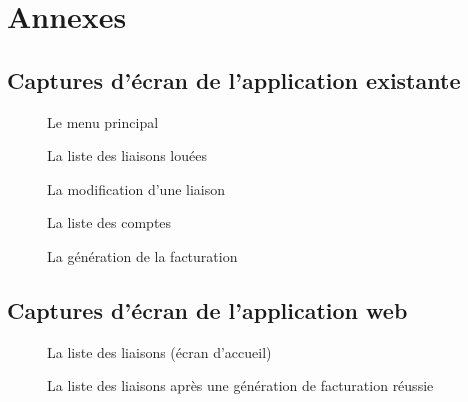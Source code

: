 \documentclass[a4paper,french,8pt]{article}
\begin{document}
	

\section{Annexes}
	\subsection{Captures d'écran de l'application existante}
	\newpage
		\begin{figure}[h!]
			\caption{Le menu principal}
			\centering
		\end{figure} 
		
		\begin{figure}[h!]
			\caption{La liste des liaisons louées}
			\centering
		\end{figure}
		
		\begin{figure}[h!]
			\caption{La modification d'une liaison}
			\centering
		\end{figure} 
		
		\begin{figure}[h!]
			\caption{La liste des comptes}
			\centering
		\end{figure} 

		\begin{figure}[h!]
			\caption{La génération de la facturation}
			\centering
		\end{figure} 
			
		
		\newpage
		
		
		\subsection{Captures d'écran de l'application web}
		\newpage
		\begin{figure}[h!]
			\caption{La liste des liaisons (écran d'accueil)}
			\centering
		\end{figure} 
		
		\begin{figure}[h!]
			\caption{La liste des liaisons après une génération de facturation réussie}
			\centering
		\end{figure} 
		
\end{document}
